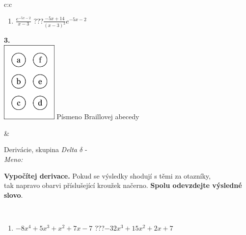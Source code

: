 \documentclass[10pt]{report}
\begin{document}
\begin{tabular}{c:c}
\begin{minipage}[c][104.5mm][t]{0.5\linewidth}
\begin{center}
\begin{minipage}{0.79\linewidth}
\begin{center}
\begin{varwidth}{\linewidth}
\begin{enumerate}
\item $\frac{e^{-5x-2}}{x-3}$\quad \dotfill\; ???\;\dotfill \quad $\frac{-5x+14}{(x-3)^2}e^{-5x-2}$
\end{enumerate}
\end{varwidth}
\end{center}
\end{minipage}
\begin{minipage}{0.20\linewidth}
\begin{center}
{\Huge\bfseries 3.} \\[2mm]
\includegraphics[height=40mm]{../images/braille.png}
{\small Písmeno Braillovej abecedy}
\end{center}
\end{minipage}
\end{center}
\end{minipage}
&
\begin{minipage}[c][104.5mm][t]{0.5\linewidth}
\begin{center}
\vspace{7mm}
{\huge Derivácie, skupina \textit{Delta $\delta$} -}\\[5mm]
\textit{Meno:}\phantom{xxxxxxxxxxxxxxxxxxxxxxxxxxxxxxxxxxxxxxxxxxxxxxxxxxxxxxxxxxxxxxxxx}\\[5mm]
\begin{minipage}{0.95\linewidth}
\begin{center}
\textbf{Vypočítej derivace.} Pokud se výsledky shodují s těmi za otazníky,\\tak napravo obarvi příslušející kroužek načerno. \textbf{Spolu odevzdejte výsledné slovo}.
\end{center}
\end{minipage}
\\[1mm]
\begin{minipage}{0.79\linewidth}
\begin{center}
\begin{varwidth}{\linewidth}
\begin{enumerate}
\normalsize
\item $-8x^4+5x^3+x^2+7x-7$\quad \dotfill\; ???\;\dotfill \quad $-32x^3+15x^2+2x+7$

\end{enumerate}
\end{varwidth}
\end{center}
\end{minipage}
\end{center}
\end{minipage}
\end{tabular}
\end{document}
